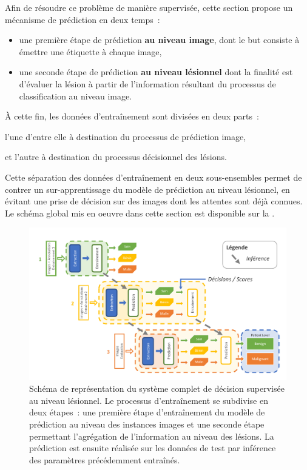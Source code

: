 Afin de résoudre ce problème de manière supervisée, cette section propose un mécanisme de prédiction en deux temps~: 
\begin{itemize}
    \item une première étape de prédiction \textbf{au niveau image}, dont le but consiste à émettre une étiquette à chaque image,
    \item une seconde étape de prédiction \textbf{au niveau lésionnel} dont la finalité est d'évaluer la lésion à partir de l'information résultant du processus de classification au niveau image.
\end{itemize} À cette fin, les données d'entraînement sont divisées en deux parts~:
\begin{inlinerate}
    \item l'une d'entre elle à destination du processus de prédiction image,
    \item et l'autre à destination du processus décisionnel des lésions.
\end{inlinerate}
Cette séparation des données d'entraînement en deux sous-ensembles permet de contrer un sur-apprentissage du modèle de prédiction au niveau lésionnel, en évitant une prise de décision sur des images dont les attentes sont déjà connues. Le schéma global mis en oeuvre dans cette section est disponible sur la .\par

\begin{figure}[H]
    \centering
    \includegraphics[width=0.95\linewidth]{contents/chapter_7/resources/scheme_patient_decision.pdf}
    \caption{Schéma de représentation du système complet de décision supervisée au niveau lésionnel. Le processus d'entraînement se subdivise en deux étapes~: une première étape d'entraînement du modèle de prédiction au niveau des instances images et une seconde étape permettant l'agrégation de l'information au niveau des lésions. La prédiction est ensuite réalisée sur les données de test par inférence des paramètres précédemment entraînés.}
    \label{fig:scheme_patient_decision}
\end{figure}\par

